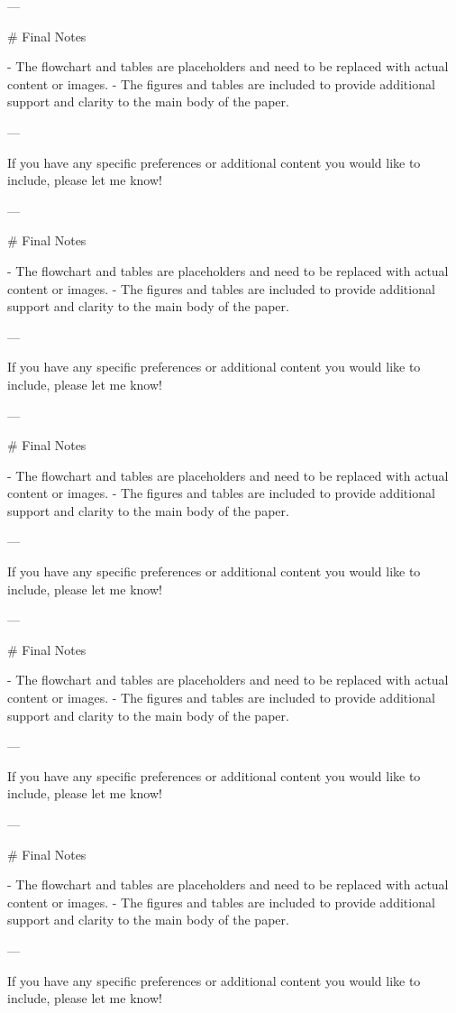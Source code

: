---

# Final Notes

- The flowchart and tables are placeholders and need to be replaced with actual content or images.
- The figures and tables are included to provide additional support and clarity to the main body of the paper.

---

If you have any specific preferences or additional content you would like to include, please let me know! 

---

# Final Notes

- The flowchart and tables are placeholders and need to be replaced with actual content or images.
- The figures and tables are included to provide additional support and clarity to the main body of the paper.

---

If you have any specific preferences or additional content you would like to include, please let me know! 

---

# Final Notes

- The flowchart and tables are placeholders and need to be replaced with actual content or images.
- The figures and tables are included to provide additional support and clarity to the main body of the paper.

---

If you have any specific preferences or additional content you would like to include, please let me know! 

---

# Final Notes

- The flowchart and tables are placeholders and need to be replaced with actual content or images.
- The figures and tables are included to provide additional support and clarity to the main body of the paper.

---

If you have any specific preferences or additional content you would like to include, please let me know! 

---

# Final Notes

- The flowchart and tables are placeholders and need to be replaced with actual content or images.
- The figures and tables are included to provide additional support and clarity to the main body of the paper.

---

If you have any specific preferences or additional content you would like to include, please let me know! 

